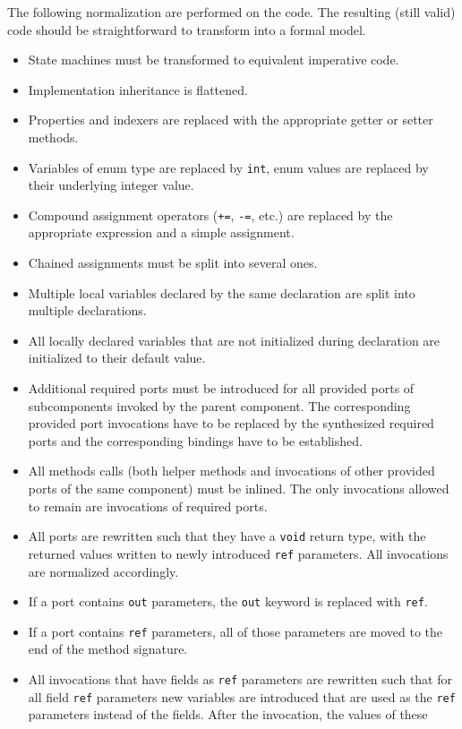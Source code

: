 \documentclass[a4paper,10pt,english]{article}
\begin{document}
The following normalization are performed on the \CSharp code. The resulting (still valid) \CSharp code should be straightforward
to transform into a formal model.
\begin{itemize}
	\item State machines must be transformed to equivalent imperative code.
	\item Implementation inheritance is flattened. 
	\item Properties and indexers are replaced with the appropriate getter or setter methods.
	\item Variables of enum type are replaced by \texttt{int}, enum values are replaced by their underlying integer value.
	\item Compound assignment operators (\texttt{+=}, \texttt{-=}, etc.) are replaced by the appropriate expression and a simple
	assignment.
	\item Chained assignments must be split into several ones.
	\item Multiple local variables declared by the same declaration are split into multiple declarations.
	\item All locally declared variables that are not initialized during declaration are initialized to their default value.
	\item Additional required ports must be introduced for all provided ports of subcomponents invoked by the parent component. The
	corresponding provided port invocations have to be replaced by the synthesized required ports and the corresponding bindings have
	to be established.
	\item All methods calls (both helper methods and invocations of other provided ports of the same component) must be inlined. The
	only invocations allowed to remain are invocations of required ports.
	\item All ports are rewritten such that they have a \texttt{void} return type, with the returned values written to newly
	introduced \texttt{ref} parameters. All invocations are normalized accordingly.
	\item If a port contains \texttt{out} parameters, the \texttt{out} keyword is replaced with \texttt{ref}.
	\item If a port contains \texttt{ref} parameters, all of those parameters are moved to the end of the method signature.
	\item All invocations that have fields as \texttt{ref} parameters are rewritten such that for all field \texttt{ref} parameters new variables are
	introduced that are used as the \texttt{ref} parameters instead of the fields. After the invocation, the values of these

\end{itemize}
\end{document}
